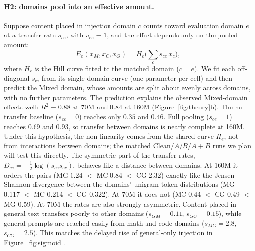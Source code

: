 \documentclass{article} %
\begin{document}
\paragraph{H2: domains pool into an effective amount.}
Suppose content placed in injection domain $c$ counts toward evaluation domain $e$ at a transfer rate $s_{ce}$, with $s_{ee}=1$, and the effect depends only on the pooled amount:
\begin{equation}
E_e(x_M,x_C,x_G)=H_e\Big(\textstyle\sum_{c} s_{ce}\,x_c\Big),
\label{eq:pool}
\end{equation}
where $H_e$ is the Hill curve fitted to the matched domain ($c{=}e$). We fit each off-diagonal $s_{ce}$ from its single-domain curve (one parameter per cell) and then predict the Mixed domain, whose amounts are split about evenly across domains, with no further parameters. The prediction explains the observed Mixed-domain effects well: $R^2=0.88$ at 70M and $0.84$ at 160M (Figure~\ref{fig:theory}b). The no-transfer baseline ($s_{ce}=0$) reaches only $0.35$ and $0.46$. Full pooling ($s_{ce}=1$) reaches $0.69$ and $0.93$, so transfer between domains is nearly complete at 160M. Under this hypothesis, the non-linearity comes from the shared curve $H_e$, not from interactions between domains; the matched Clean/$A$/$B$/$A{+}B$ runs we plan will test this directly. The symmetric part of the transfer rates, $D_{ce}=-\tfrac12\log(s_{ce}s_{ec})$, behaves like a distance between domains. At 160M it orders the pairs (MG 0.24 $<$ MC 0.84 $<$ CG 2.32) exactly like the Jensen--Shannon divergence between the domains' unigram token distributions (MG 0.117 $<$ MC 0.214 $<$ CG 0.322). At 70M it does not (MC 0.44 $<$ CG 0.49 $<$ MG 0.59). At 70M the rates are also strongly asymmetric. Content placed in general text transfers poorly to other domains ($s_{GM}=0.11$, $s_{GC}=0.15$), while general prompts are reached easily from math and code domains ($s_{MG}=2.8$, $s_{CG}=2.5$). This matches the delayed rise of general-only injection in Figure~\ref{fig:sigmoid}.
\end{document}
